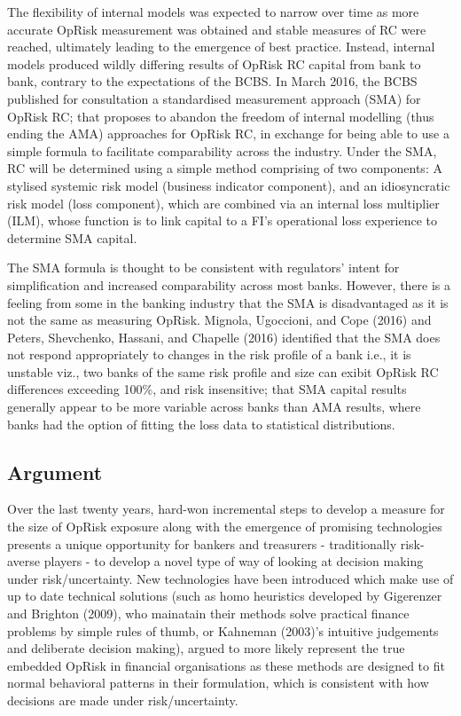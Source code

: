 \documentclass[]{DissertateUSU}
\begin{document}
The flexibility of internal models was expected to narrow over time as
more accurate OpRisk measurement was obtained and stable measures of RC
were reached, ultimately leading to the emergence of best practice.
Instead, internal models produced wildly differing results of OpRisk RC
capital from bank to bank, contrary to the expectations of the BCBS. In
March 2016, the BCBS published for consultation a standardised
measurement approach (SMA) for OpRisk RC; that proposes to abandon the
freedom of internal modelling (thus ending the AMA) approaches for
OpRisk RC, in exchange for being able to use a simple formula to
facilitate comparability across the industry. Under the SMA, RC will be
determined using a simple method comprising of two components: A
stylised systemic risk model (business indicator component), and an
idiosyncratic risk model (loss component), which are combined via an
internal loss multiplier (ILM), whose function is to link capital to a
FI's operational loss experience to determine SMA capital.\medskip

The SMA formula is thought to be consistent with regulators' intent for
simplification and increased comparability across most banks. However,
there is a feeling from some in the banking industry that the SMA is
disadvantaged as it is not the same as measuring OpRisk. Mignola,
Ugoccioni, and Cope (2016) and Peters, Shevchenko, Hassani, and Chapelle
(2016) identified that the SMA does not respond appropriately to changes
in the risk profile of a bank i.e., it is unstable viz., two banks of
the same risk profile and size can exibit OpRisk RC differences
exceeding 100\%, and risk insensitive; that SMA capital results
generally appear to be more variable across banks than AMA results,
where banks had the option of fitting the loss data to statistical
distributions.\medskip 

\subsection{Argument}

Over the last twenty years, hard-won incremental steps to develop a
measure for the size of OpRisk exposure along with the emergence of
promising technologies presents a unique opportunity for bankers and
treasurers - traditionally risk-averse players - to develop a novel type
of way of looking at decision making under risk/uncertainty. New
technologies have been introduced which make use of up to date technical
solutions (such as homo heuristics developed by Gigerenzer and Brighton
(2009), who mainatain their methods solve practical finance problems by
simple rules of thumb, or Kahneman (2003)'s intuitive judgements and
deliberate decision making), argued to more likely represent the true
embedded OpRisk in financial organisations as these methods are designed
to fit normal behavioral patterns in their formulation, which is
consistent with how decisions are made under risk/uncertainty.\medskip 
\end{document}
